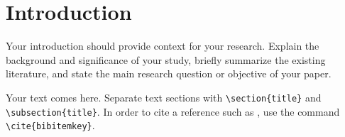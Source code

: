 \documentclass[JMCS, accept]{resources/ISRP}
\begin{document}
\begin{abstract}
The abstract should provide a concise summary of the research, emphasizing the problem addressed, key results, and their significance within the field. The abstract should be structured as follows, without explicit headings:
\begin{enumerate}
	\item \textbf{Problem Statement:} Briefly describe the problem or question addressed in the study, placing it within the context of existing research.
	\item \textbf{Main Results:} Summarize the key findings or theorems presented in the paper, highlighting their novelty and importance.
	\item \textbf{Implications:} Discuss the broader implications of the results, including potential applications or future research directions. Emphasize how the findings contribute to the understanding of the topic.
\end{enumerate}


\begin{keyword}First keyword \sep Second keyword \sep More.First keyword \sep Second keyword \sep MoreFirst keyword \sep Second keyword \sep MoreFirst keyword \sep Second keyword \sep MoreFirst keyword \sep Second keyword \sep MoreFirst keyword \sep Second keyword \sep More
\end{keyword}
\end{abstract}
\maketitle







\section{Introduction}\label{intro}%
 Your introduction should provide context for your research. Explain the background and significance of your study, briefly summarize the existing literature, and state the main research question or objective of your paper.

Your text comes here. Separate text sections with \verb|\section{title}| and \verb|\subsection{title}|. In order to cite a reference such as \cite{1,2,3}, use the command \verb|\cite{bibitemkey}|.
\end{document}
